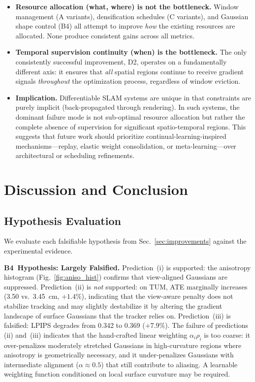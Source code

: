 \documentclass[conference]{IEEEtran}
\begin{document}
\begin{itemize}
    \item \textbf{Resource allocation (what, where) is not the bottleneck.} Window management (A variants), densification schedules (C variants), and Gaussian shape control ({B4}) all attempt to improve \textit{how} the existing resources are allocated. None produce consistent gains across all metrics.
    \item \textbf{Temporal supervision continuity (when) is the bottleneck.} The only consistently successful improvement, {D2}, operates on a fundamentally different axis: it ensures that \textit{all} spatial regions continue to receive gradient signals \textit{throughout} the optimization process, regardless of window eviction.
    \item \textbf{Implication.} Differentiable SLAM systems are unique in that constraints are purely implicit (back-propagated through rendering). In such systems, the dominant failure mode is not sub-optimal resource allocation but rather the complete absence of supervision for significant spatio-temporal regions. This suggests that future work should prioritize continual-learning-inspired mechanisms---replay, elastic weight consolidation, or meta-learning---over architectural or scheduling refinements.
\end{itemize}

\section{Discussion and Conclusion}
\label{sec:discussion}

\subsection{Hypothesis Evaluation}
\label{sec:hyp_eval}

We evaluate each falsifiable hypothesis from Sec.~\ref{sec:improvements} against the experimental evidence.

\textbf{{B4}~Hypothesis: Largely Falsified.}
Prediction~(i) is supported: the anisotropy histogram (Fig.~\ref{fig:aniso_hist}) confirms that view-aligned Gaussians are suppressed.
Prediction~(ii) is \textit{not} supported: on TUM, ATE marginally increases (3.50 vs.\ 3.45~cm, $+1.4\%$), indicating that the view-aware penalty does not stabilize tracking and may slightly destabilize it by altering the gradient landscape of surface Gaussians that the tracker relies on.
Prediction~(iii) is falsified: LPIPS degrades from 0.342 to 0.369 ($+7.9\%$).
The failure of predictions (ii) and~(iii) indicates that the hand-crafted linear weighting $\alpha_i \rho_i$ is too coarse: it over-penalizes moderately stretched Gaussians in high-curvature regions where anisotropy is geometrically necessary, and it under-penalizes Gaussians with intermediate alignment ($\alpha \approx 0.5$) that still contribute to aliasing.
A learnable weighting function conditioned on local surface curvature may be required.
\end{document}
